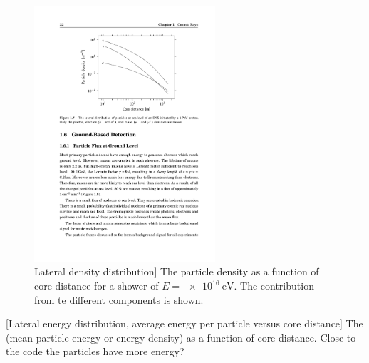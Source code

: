 \,

\begin{figure}
    \centering
    \includegraphics[width=0.6\textwidth]
                    {plots/cosmic-rays/ldf}
    \caption{Lateral density distribution]
The particle density as a function of core distance for a shower of $E = \SI{e16}{\eV}$. The contribution from te different components is shown.}
    \label{fig:ldf}
\end{figure}

[Lateral energy distribution, average energy per particle versus core distance]
The (mean particle energy or energy density) as a function of core distance. Close to the code the particles have more energy?

